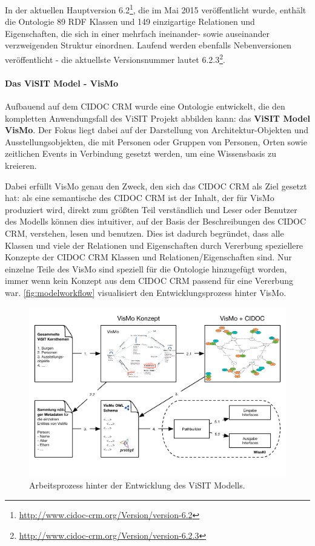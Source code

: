 In der aktuellen Hauptversion 6.2\footnote{\url{http://www.cidoc-crm.org/Version/version-6.2}}, die im Mai 2015 veröffentlicht wurde, enthält die Ontologie 89 RDF Klassen und 149 einzigartige Relationen und Eigenschaften, die sich in einer mehrfach ineinander- sowie auseinander verzweigenden Struktur einordnen. Laufend werden ebenfalls Nebenversionen veröffentlicht - die aktuellste Versionsnummer lautet 6.2.3\footnote{\url{http://www.cidoc-crm.org/Version/version-6.2.3}}.

\paragraph{Das ViSIT Model - VisMo}

Aufbauend auf dem CIDOC CRM wurde eine Ontologie entwickelt, die den kompletten Anwendungsfall des ViSIT Projekt abbilden kann: das \textbf{ViSIT Model VisMo}. Der Fokus liegt dabei auf der Darstellung von Architektur-Objekten und Ausstellungsobjekten, die mit Personen oder Gruppen von Personen, Orten sowie zeitlichen Events in Verbindung gesetzt werden, um eine Wissensbasis zu kreieren.

Dabei erfüllt VisMo genau den Zweck, den sich das CIDOC CRM als Ziel gesetzt hat: als eine semantische  des CIDOC CRM ist der Inhalt, der für VisMo produziert wird, direkt zum größten Teil verständlich und Leser oder Benutzer des Modells können dies intuitiver, auf der Basis der Beschreibungen des CIDOC CRM, verstehen, lesen und benutzen. Dies ist dadurch begründet, dass alle Klassen und viele der Relationen und Eigenschaften durch Vererbung speziellere Konzepte der CIDOC CRM Klassen und Relationen/Eigenschaften sind. Nur einzelne Teile des VisMo sind speziell für die Ontologie hinzugefügt worden, immer wenn kein Konzept aus dem CIDOC CRM passend für eine Vererbung war. \autoref{fig:modelworkflow} visualisiert den Entwicklungsprozess hinter VisMo.

\begin{figure}[htb]
    \centering
    \includegraphics[width=\textwidth]{Figures/berndl/modelworkflow}
    \caption{\label{fig:modelworkflow} Arbeitsprozess hinter der Entwicklung des ViSIT Modells.}
\end{figure}

